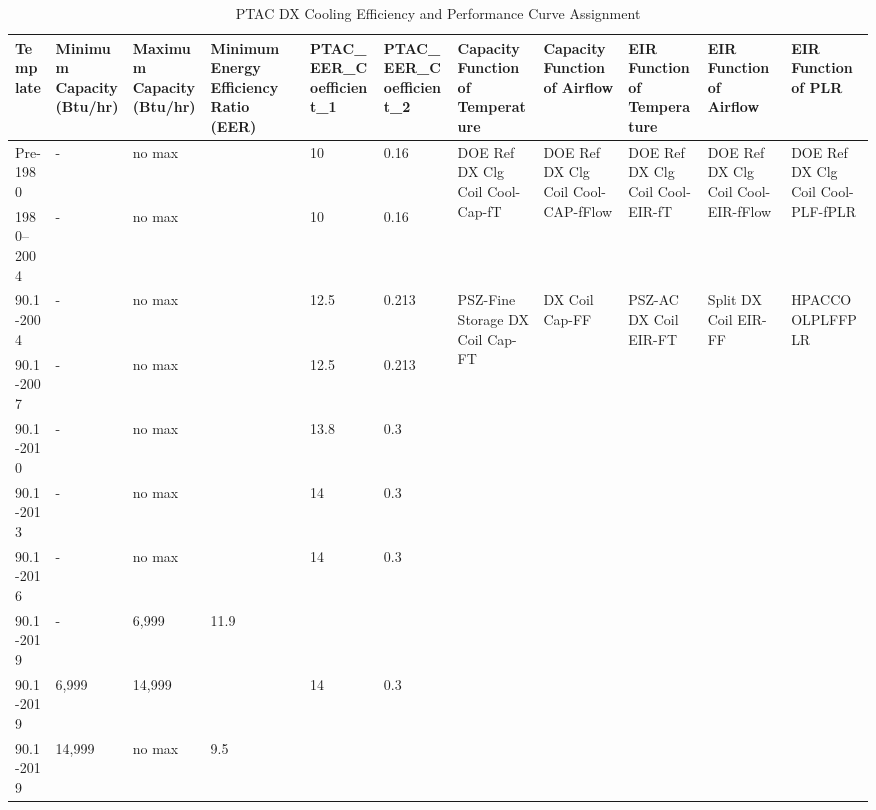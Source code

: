 \begin{table}[ht!]
\scriptsize
\centering
\caption{PTAC DX Cooling Efficiency and Performance Curve Assignment}
\label{tab:ptac_efficiencies}
\begin{tabular}{|p{0.4in}|p{0.4in}|p{0.4in}|p{0.4in}|p{0.4in}|p{0.4in}|p{0.4in}|p{0.4in}|p{0.4in}|p{0.4in}|p{0.4in}|}
\hline
\textbf{Template} &
  \textbf{Minimum Capacity   (Btu/hr)} &
  \textbf{Maximum Capacity   (Btu/hr)} &
  \textbf{Minimum Energy   Efficiency Ratio (EER)} &
  \textbf{PTAC\_EER\_Coefficient\_1} &
  \textbf{PTAC\_EER\_Coefficient\_2} &
  \textbf{Capacity Function of Temperature} &
  \textbf{Capacity Function of Airflow} &
  \textbf{EIR Function of Temperature} &
  \textbf{EIR Function of Airflow} &
  \textbf{EIR Function of PLR} \\ \hline
Pre-1980 & - & no max & & 10 & 0.16 &
  \multirow{2}{*}{\parbox{0.4in}{DOE Ref DX Clg Coil Cool-Cap-fT}} &
  \multirow{2}{*}{\parbox{0.4in}{DOE Ref DX Clg Coil Cool-CAP-fFlow}} &
  \multirow{2}{*}{\parbox{0.4in}{DOE Ref DX Clg Coil Cool-EIR-fT}} &
  \multirow{2}{*}{\parbox{0.4in}{DOE Ref DX Clg Coil Cool-EIR-fFlow}} &
  \multirow{2}{*}{\parbox{0.4in}{DOE Ref DX Clg Coil Cool-PLF-fPLR}} \\ \cline{1-6} 
1980--2004         & -      & no max &      & 10   & 0.16  &  &  &  &  &  \\ \hline
90.1-2004         & -      & no max &      & 12.5 & 0.213 &
  \multirow{8}{*}{\parbox{0.4in}{PSZ-Fine Storage DX Coil Cap-FT}} &
  \multirow{8}{*}{\parbox{0.4in}{DX Coil Cap-FF}} &
  \multirow{8}{*}{\parbox{0.4in}{PSZ-AC DX Coil EIR-FT}} &
  \multirow{8}{*}{\parbox{0.4in}{Split DX Coil EIR-FF}} &
  \multirow{8}{*}{\parbox{0.4in}{HPAC\-COOLPL\-FFPLR}} \\ \cline{1-6} 
90.1-2007         & -      & no max &      & 12.5 & 0.213 &  &  &  &  & \\ \cline{1-6} 
90.1-2010         & -      & no max &      & 13.8 & 0.3   &  &  &  &  & \\ \cline{1-6} 
90.1-2013         & -      & no max &      & 14   & 0.3   &  &  &  &  & \\ \cline{1-6} 
90.1-2016         & -      & no max &      & 14   & 0.3   &  &  &  &  & \\ \cline{1-6} 
90.1-2019         & -      & 6,999  & 11.9 &      &       &  &  &  &  & \\ \cline{1-6}
90.1-2019         & 6,999  & 14,999 &      & 14   & 0.3   &  &  &  &  & \\ \cline{1-6}
90.1-2019         & 14,999 & no max & 9.5  &      &       &  &  &  &  & \\ \hline
\end{tabular}
\end{table}